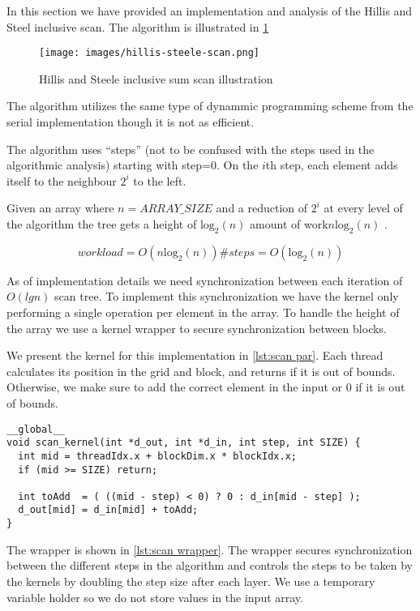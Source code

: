 In this section we have provided an implementation and analysis of the Hillis and Steel inclusive scan.
The algorithm is illustrated in \cref{fig:hillis steele scan}

\begin{figure}[htb]
  \centering
  \texttt{[image: images/hillis-steele-scan.png]}
  \caption{Hillis and Steele inclusive sum scan illustration}
  \label{fig:hillis steele scan}
\end{figure}

The algorithm utilizes the same type of dynammic programming scheme from the serial implementation though it is not as efficient.

The algorithm uses ``steps'' (not to be confused with the steps used in the algorithmic analysis) starting with step=0.
On the $i$th step, each element adds itself to the neighbour $2^i$ to the left.

Given an array where $n=ARRAY\_SIZE$ and a reduction of $2^i$ at every level of the algorithm the tree gets a height of $\mathrm{log}_2(n)$ amount of work$n \mathrm{log}_2(n)$ .


\begin{equation*}
work load = O(n \mathrm{log}_2(n))
\#steps = O(\mathrm{log}_2(n))
\end{equation*}

As of implementation details we need synchronization between each iteration of $O(lgn)$ scan tree.
To implement this synchronization we have the kernel only performing a single operation per element in the array.
To handle the height of the array we use a kernel wrapper to secure synchronization between blocks.

We present the kernel for this implementation in \cref{lst:scan par}.
Each thread calculates its position in the grid and block, and returns if it is out of bounds.
Otherwise, we make sure to add the correct element in the input or 0 if it is out of bounds.

\begin{lstlisting}[caption={Hillis and Steele scan kernel}, label={lst:scan par}]
__global__
void scan_kernel(int *d_out, int *d_in, int step, int SIZE) {
  int mid = threadIdx.x + blockDim.x * blockIdx.x;
  if (mid >= SIZE) return;

  int toAdd  = ( ((mid - step) < 0) ? 0 : d_in[mid - step] );
  d_out[mid] = d_in[mid] + toAdd;
}
\end{lstlisting}

The wrapper is shown in \cref{lst:scan wrapper}.
The wrapper secures synchronization between the different steps in the algorithm and controls the steps to be taken by the kernels by doubling the step size after each layer.
We use a temporary variable holder so we do not store values in the input array.

